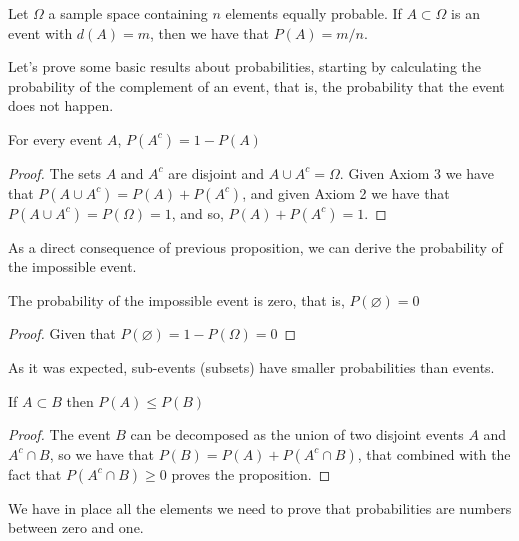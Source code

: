 \begin{example}
\label{ex:discrete_sample_space}
Let $\Omega$ a sample space containing $n$ elements equally probable. If $A \subset \Omega$ is an event with $d(A) = m$, then we have that $P(A) = m/n$.
\end{example}

Let's prove some basic results about probabilities, starting by calculating the probability of the complement of an event, that is, the probability that the event does not happen.

\begin{proposition}
For every event $A$, $P \left( A^{c} \right) = 1 - P \left( A \right)$
\end{proposition}
\begin{proof}
The sets $A$ and $A^c$ are disjoint and $A \cup A^c = \Omega$. Given Axiom 3 we have that $P \left( A \cup A^c \right) = P \left( A \right) + P \left( A^c \right)$, and given Axiom 2 we have that $P \left( A \cup A^c \right) = P(\Omega) = 1$, and so, $P \left( A \right) + P \left( A^c \right) = 1$.
\end{proof}

As a direct consequence of previous proposition, we can derive the probability of the impossible event.

\begin{proposition}
The probability of the impossible event is zero, that is, $P \left( \varnothing \right) = 0$
\end{proposition}
\begin{proof}
Given that $P \left( \varnothing \right) = 1 - P \left( \Omega \right) = 0$
\end{proof}

As it was expected, sub-events (subsets) have smaller probabilities than events.

\begin{proposition}
If $A\subset B$ then $P \left( A \right) \leq P \left( B \right)$
\end{proposition}
\begin{proof}
The event $B$ can be decomposed as the union of two disjoint events $A$ and $A^c \cap B$, so we have that $P \left( B \right) = P \left( A \right) + P \left( A^c \cap B \right)$, that combined with the fact that  $P \left( A^c \cap B \right) \geq 0$ proves the proposition.
\end{proof}

We have in place all the elements we need to prove that probabilities are numbers between zero and one.

